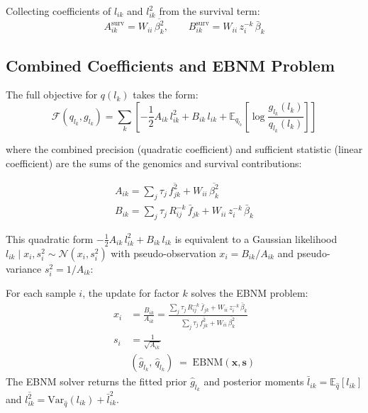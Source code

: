 \documentclass[11pt]{article}
\newcommand{\lbar}[2]{\bar{l}_{#1#2}}
\newcommand{\fbar}[2]{\bar{f}_{#1#2}}
\newcommand{\betabar}[1]{\bar{\beta}_{#1}}
\newcommand{\lsec}[2]{\overline{l^2_{#1#2}}}
\newcommand{\fsec}[2]{\overline{f^2_{#1#2}}}
\newcommand{\betasec}[1]{\overline{\beta^2_{#1}}}
\begin{document}
Collecting coefficients of $l_{ik}$ and $l_{ik}^2$ from the survival term:
\begin{equation}\label{eq:survival-AB}
  A^{\text{surv}}_{ik} = W_{ii}\,\betasec{k},
  \qquad
  B^{\text{surv}}_{ik} = W_{ii}\,z^{-k}_i\,\betabar{k}
\end{equation}

\subsection{Combined Coefficients and EBNM Problem}

The full objective for $q(l_k)$ takes the form:
\[
  \mathcal{F}(q_{l_k}, g_{l_k})
  = \sum_k\left[
      -\frac{1}{2}A_{ik}\,l_{ik}^2 + B_{ik}\,l_{ik}
      + \mathbb{E}_{q_{l_k}}\!\left[\log\frac{g_{l_k}(l_k)}{q_{l_k}(l_k)}\right]
    \right]
\]

where the combined precision (quadratic coefficient) and sufficient statistic
(linear coefficient) are the sums of the genomics and survival contributions:

\begin{align}
  \boxed{A_{ik} = \sum_j \tau_j\,\fsec{j}{k} + W_{ii}\,\betasec{k}}
  \label{eq:A-L}\\[4pt]
  \boxed{B_{ik} = \sum_j \tau_j\,R^{-k}_{ij}\,\fbar{j}{k} + W_{ii}\,z^{-k}_i\,\betabar{k}}
  \label{eq:B-L}
\end{align}

This quadratic form $-\tfrac{1}{2}A_{ik}\,l_{ik}^2 + B_{ik}\,l_{ik}$ is
equivalent to a Gaussian likelihood $l_{ik} \mid x_i, s_i^2 \sim \mathcal{N}(x_i, s_i^2)$
with pseudo-observation $x_i = B_{ik}/A_{ik}$ and pseudo-variance
$s_i^2 = 1/A_{ik}$:

\begin{ebnmbox}
For each sample $i$, the update for factor $k$ solves the EBNM problem:
\begin{align}
  x_i &= \frac{B_{ik}}{A_{ik}}
       = \frac{\displaystyle\sum_j \tau_j\,R^{-k}_{ij}\,\fbar{j}{k}
               + W_{ii}\,z^{-k}_i\,\betabar{k}}
              {\displaystyle\sum_j \tau_j\,\fsec{j}{k} + W_{ii}\,\betasec{k}}
  \label{eq:xi-L}\\[6pt]
  s_i &= \frac{1}{\sqrt{A_{ik}}} \label{eq:si-L}\\[6pt]
  &(\hat{g}_{l_k},\, \hat{q}_{l_k}) \;=\; \mathrm{EBNM}(\mathbf{x}, \mathbf{s})
\end{align}
The EBNM solver returns the fitted prior $\hat{g}_{l_k}$ and posterior moments
$\lbar{i}{k} = \mathbb{E}_{\hat{q}}[l_{ik}]$ and
$\lsec{i}{k} = \mathrm{Var}_{\hat{q}}(l_{ik}) + \lbar{i}{k}^2$.
\end{ebnmbox}
\end{document}
